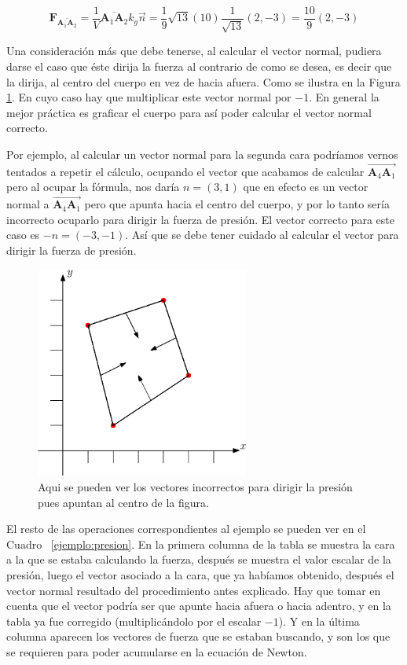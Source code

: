 $$\textbf{F}_{\overline{\textbf{A}_1 \textbf{A}_2}} = \frac{1}{V}\overline{\textbf{A}_1 \textbf{A}_2} k_g \vec{n} = \frac{1}{9} \sqrt{13} \left( 10 \right)  \frac{1}{\sqrt{13}} (2, -3) = \frac{10}{9}(2, -3) $$

Una consideración más que debe tenerse, al calcular el vector normal, pudiera darse el caso que éste dirija la fuerza al contrario de como se desea, es decir que la dirija, al centro del cuerpo en vez de hacia afuera.
Como se ilustra en la Figura \ref{presionMal:fig}.
En cuyo caso hay que multiplicar este vector normal por $-1$.
En general la mejor práctica es graficar el cuerpo para así poder calcular el vector normal correcto.

Por ejemplo, al calcular un vector normal para la segunda cara podríamos vernos tentados a repetir el cálculo, ocupando el vector que acabamos de calcular $\overrightarrow{\textbf{A}_4 \textbf{A}_1}$ pero al ocupar la fórmula, nos daría $n=(3,1)$ que en efecto es un vector normal a $\overrightarrow{\textbf{A}_4 \textbf{A}_1}$ pero que apunta hacia el centro del cuerpo, y por lo tanto sería incorrecto ocuparlo para dirigir la fuerza de presión.
El vector correcto para este caso es $-n = (-3,-1)$.
Así que se debe tener cuidado al calcular el vector para dirigir la fuerza de presión.

\begin{figure}
 \centering
 \includegraphics[width=7cm]{Img/01/presion_mal}
 \caption[Vectores de presión incorrectos]{ 
 Aqui se pueden ver los vectores incorrectos para dirigir la presión pues apuntan al centro de la figura.
 } \label{presionMal:fig}
\end{figure}

El resto de las operaciones correspondientes al ejemplo se pueden ver en el Cuadro ~\ref{ejemplo:presion}.
En la primera columna de la tabla se muestra la cara a la que se estaba calculando la fuerza, después se muestra el valor escalar de la presión, luego el vector asociado a la cara, que ya habíamos obtenido, después el vector normal resultado del procedimiento antes explicado.
Hay que tomar en cuenta que el vector podría ser que apunte hacia afuera o hacia adentro, y en la tabla ya fue corregido (multiplicándolo por el escalar $-1$).
Y en la última columna aparecen los vectores de fuerza que se estaban buscando, y son los que se requieren para poder acumularse en la ecuación de Newton.

